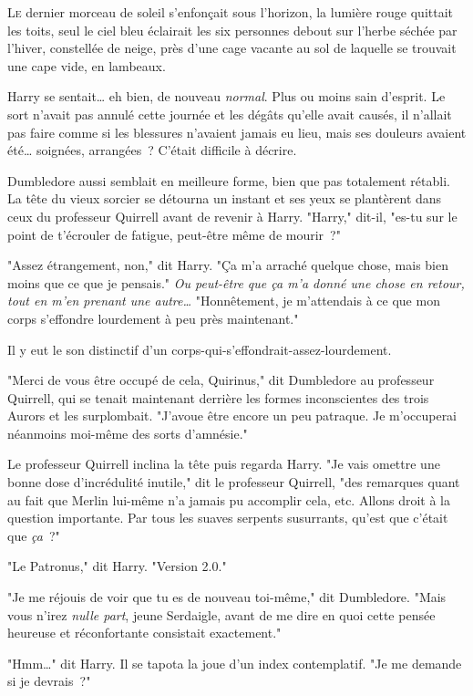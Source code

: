 
\lettrine{L}{e} dernier morceau de soleil s'enfonçait sous l'horizon, la lumière rouge quittait les toits, seul le ciel bleu éclairait les six personnes debout sur l'herbe séchée par l'hiver, constellée de neige, près d'une cage vacante au sol de laquelle se trouvait une cape vide, en lambeaux.

Harry se sentait… eh bien, de nouveau \emph{normal}. Plus ou moins sain d'esprit. Le sort n'avait pas annulé cette journée et les dégâts qu'elle avait causés, il n'allait pas faire comme si les blessures n'avaient jamais eu lieu, mais ses douleurs avaient été… soignées, arrangées~? C'était difficile à décrire.

Dumbledore aussi semblait en meilleure forme, bien que pas totalement rétabli. La tête du vieux sorcier se détourna un instant et ses yeux se plantèrent dans ceux du professeur Quirrell avant de revenir à Harry. "Harry," dit-il, "es-tu sur le point de t'écrouler de fatigue, peut-être même de mourir~?"

"Assez étrangement, non," dit Harry. "Ça m'a arraché quelque chose, mais bien moins que ce que je pensais." \emph{Ou peut-être que ça m'a donné une chose en retour, tout en m'en prenant une autre…} "Honnêtement, je m'attendais à ce que mon corps s'effondre lourdement à peu près maintenant."

Il y eut le son distinctif d'un corps-qui-s'effondrait-assez-lourdement.

"Merci de vous être occupé de cela, Quirinus," dit Dumbledore au professeur Quirrell, qui se tenait maintenant derrière les formes inconscientes des trois Aurors et les surplombait. "J'avoue être encore un peu patraque. Je m'occuperai néanmoins moi-même des sorts d'amnésie."

Le professeur Quirrell inclina la tête puis regarda Harry. "Je vais omettre une bonne dose d'incrédulité inutile," dit le professeur Quirrell, "des remarques quant au fait que Merlin lui-même n'a jamais pu accomplir cela, etc. Allons droit à la question importante. Par tous les suaves serpents susurrants, qu'est que c'était que \emph{ça}~?"

"Le Patronus," dit Harry. "Version 2.0."

"Je me réjouis de voir que tu es de nouveau toi-même," dit Dumbledore. "Mais vous n'irez \emph{nulle part}, jeune Serdaigle, avant de me dire en quoi cette pensée heureuse et réconfortante consistait exactement."

"Hmm…" dit Harry. Il se tapota la joue d'un index contemplatif. "Je me demande si je devrais~?"

